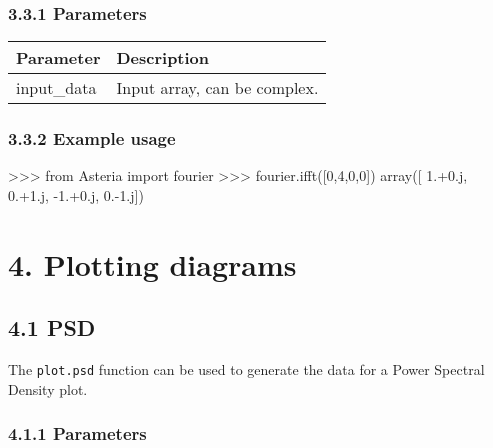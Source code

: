 \documentclass[]{article}
\newenvironment{Shaded}{}{}
\newcommand{\DecValTok}[1]{\textcolor[rgb]{0.25,0.63,0.44}{#1}}
\newcommand{\FloatTok}[1]{\textcolor[rgb]{0.25,0.63,0.44}{#1}}
\newcommand{\ImportTok}[1]{#1}
\newcommand{\OperatorTok}[1]{\textcolor[rgb]{0.40,0.40,0.40}{#1}}
\newcommand{\NormalTok}[1]{#1}
\begin{document}
\subsubsection{3.3.1 Parameters}\label{parameters-2}

\begin{longtable}[]{@{}ll@{}}
\toprule
Parameter & Description\tabularnewline
\midrule
\endhead
input\_data & Input array, can be complex.\tabularnewline
\bottomrule
\end{longtable}

\subsubsection{3.3.2 Example usage}\label{example-usage-2}

\begin{Shaded}
\begin{Highlighting}[]
\OperatorTok{>>>} \ImportTok{from}\NormalTok{ Asteria }\ImportTok{import}\NormalTok{ fourier}
\OperatorTok{>>>}\NormalTok{ fourier.ifft([}\DecValTok{0}\NormalTok{,}\DecValTok{4}\NormalTok{,}\DecValTok{0}\NormalTok{,}\DecValTok{0}\NormalTok{])}
\NormalTok{array([ }\DecValTok{1}\NormalTok{.}\OperatorTok{+}\FloatTok{0.}\NormalTok{j,  }\DecValTok{0}\NormalTok{.}\OperatorTok{+}\FloatTok{1.}\NormalTok{j, }\OperatorTok{-}\DecValTok{1}\NormalTok{.}\OperatorTok{+}\FloatTok{0.}\NormalTok{j,  }\DecValTok{0}\NormalTok{.}\OperatorTok{-}\FloatTok{1.}\NormalTok{j])}
\end{Highlighting}
\end{Shaded}

\section{4. Plotting diagrams}\label{plotting-diagrams}

\subsection{4.1 PSD}\label{psd}

The \texttt{plot.psd} function can be used to generate the data for a
Power Spectral Density plot.

\subsubsection{4.1.1 Parameters}\label{parameters-3}
\end{document}
